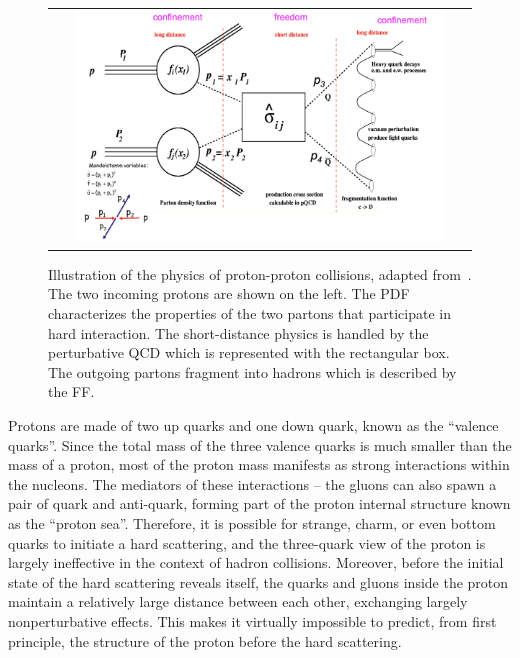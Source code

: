 \begin{figure}[tbh!]
 \begin{center}
 \begin{tabular}{c}
 \includegraphics[width=0.9\textwidth]{figures/Part1/QCD/factorization}
 \end{tabular}
 \caption{Illustration of the physics of proton-proton collisions, adapted from~\cite{Huston:fact}. The two incoming protons are shown on the left. The \ac{PDF} characterizes the properties of the two partons that participate in hard interaction. The short-distance physics is handled by the perturbative \ac{QCD} which is represented with the rectangular box. The outgoing partons fragment into hadrons which is described by the \ac{FF}.}
 \label{fig:factorization}
 \end{center}
\end{figure}

Protons are made of two up quarks and one down quark, known as the ``valence quarks''. Since the total mass of the three valence quarks is much smaller than the mass of a proton, most of the proton mass manifests as strong interactions within the nucleons. The mediators of these interactions -- the gluons can also spawn a pair of quark and anti-quark, forming part of the proton internal structure known as the ``proton sea''. Therefore, it is possible for strange, charm, or even bottom quarks to initiate a hard scattering, and the three-quark view of the proton is largely ineffective in the context of hadron collisions. Moreover, before the initial state of the hard scattering reveals itself, the quarks and gluons inside the proton maintain a relatively large distance between each other, exchanging largely nonperturbative effects. This makes it virtually impossible to predict, from first principle, the structure of the proton before the hard scattering. 

